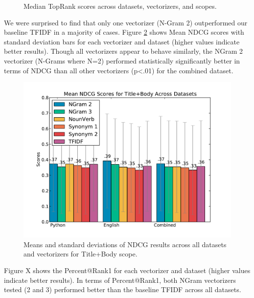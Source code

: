 \documentclass{acm_proc_article-sp}
\begin{document}
\begin{figure}[!htb]
\endminipage

\caption{Median TopRank scores across datasets, vectorizers, and scopes.}
\label{fig:toprankmedians}
\centering
\end{figure}



We were surprised to find that only one vectorizer (N-Gram 2) outperformed our baseline TFIDF in a majority of cases. Figure \ref{fig:allmeans} shows Mean NDCG scores with standard deviation bars for each vectorizer and dataset (higher values indicate better results). Though all vectorizers appear to behave similarly, the NGram 2 vectorizer (N-Grams where N=2) performed statistically significantly better in terms of NDCG than all other vectorizers (p<.01) for the combined dataset.

\begin{figure}[h]
\centering
\includegraphics[width=1\columnwidth]{images/all-means-by-dataset_plot.pdf}
\caption{Means and standard deviations of NDCG results across all datasets and vectorizers for Title+Body scope.}
\label{fig:allmeans}
\end{figure}

	
Figure X shows the Percent@Rank1 for each vectorizer and dataset (higher values indicate better results). In terms of Percent@Rank1, both NGram vectorizers tested (2 and 3) performed better than the baseline TFIDF across all datasets. 
\end{document}
